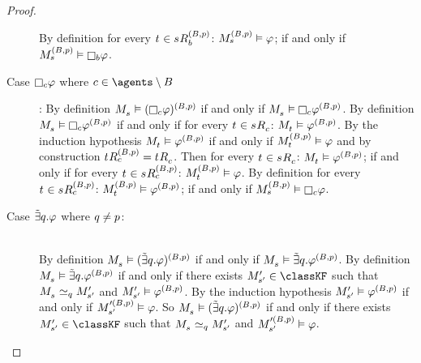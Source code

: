 \begin{proof}
\begin{description}
        By definition for every $\kStateT \in \kSuccessorsB[(\agentsB, \atomP)]{\kStateS}$: $\kPModel[(\agentsB, \atomP)]{\kStateS} \entails \phi$; if and only if $\kPModel[(\agentsB, \atomP)]{\kStateS} \entails \necessaryB \phi$.
    \item[Case $\necessaryC \phi$ where $\agentC \in \agents \setminus \agentsB$]:
        By definition $\kPModel{\kStateS} \entails (\necessaryC \phi)^{(\agentsB, \atomP)}$ if and only if $\kPModel{\kStateS} \entails \necessaryC \phi^{(\agentsB, \atomP)}$.
        By definition $\kPModel{\kStateS} \entails \necessaryC \phi^{(\agentsB, \atomP)}$ if and only if for every $\kStateT \in \kSuccessorsC{\kStateS}$: $\kPModel{\kStateT} \entails \phi^{(\agentsB, \atomP)}$.
        By the induction hypothesis $\kPModel{\kStateT} \entails \phi^{(\agentsB, \atomP)}$ if and only if $\kPModel[(\agentsB, \atomP)]{\kStateT} \entails \phi$ and by construction $\kSuccessorsC[(\agentsB, \atomP)]{\kStateT} = \kSuccessorsC{\kStateT}$.
        Then for every $\kStateT \in \kSuccessorsC{\kStateS}$: $\kPModel{\kStateT} \entails \phi^{(\agentsB, \atomP)}$; if and only if for every $\kStateT \in \kSuccessorsC[(\agentsB, \atomP)]{\kStateS}$: $\kPModel[(\agentsB, \atomP)]{\kStateT} \entails \phi$.
        By definition for every $\kStateT \in \kSuccessorsC[(\agentsB, \atomP)]{\kStateS}$: $\kPModel[(\agentsB, \atomP)]{\kStateT} \entails \phi^{(\agentsB, \atomP)}$; if and only if $\kPModel[(\agentsB, \atomP)]{\kStateS} \entails \necessaryC \phi$. 
    \item[Case $\somebisimsQ \phi$ where $\atomQ \neq \atomP$:] \hfill\\
        By definition $\kPModel{\kStateS} \entails (\somebisimsQ \phi)^{(\agentsB, \atomP)}$ if and only if $\kPModel{\kStateS} \entails \somebisimsQ \phi^{(\agentsB, \atomP)}$.
        By definition $\kPModel{\kStateS} \entails \somebisimsQ \phi^{(\agentsB, \atomP)}$ if and only if there exists $\kPModelP{\kStateSP} \in \classKF$ such that $\kPModel{\kStateS} \bisimilar[\atomQ] \kPModelP{\kStateSP}$ and $\kPModelP{\kStateSP} \entails \phi^{(\agentsB, \atomP)}$.
        By the induction hypothesis $\kPModelP{\kStateSP} \entails \phi^{(\agentsB, \atomP)}$ if and only if $\kPModel[\prime(\agentsB, \atomP)]{\kStateSP} \entails \phi$.
        So $\kPModel{\kStateS} \entails (\somebisimsQ \phi)^{(\agentsB, \atomP)}$ if and only if there exists $\kPModelP{\kStateSP} \in \classKF$ such that $\kPModel{\kStateS} \bisimilar[\atomQ] \kPModelP{\kStateSP}$ and $\kPModel[\prime(\agentsB, \atomP)]{\kStateSP} \entails \phi$.


\end{description}
\end{proof}
